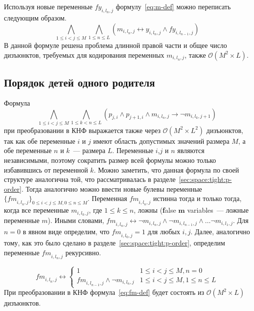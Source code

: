 Используя новые переменные $\mathit{fy}_{i,l_{n},j}$ формулу~\eqref{eq:m-def} можно переписать следующим образом.
%
\begin{equation}
\label{eq:m-def-tight}
  \bigwedge_{1 \leq i < j \leq M} \bigwedge_{1 \leq n \leq L} \left(m_{i,l_{n},j} \leftrightarrow y_{i,l_{n},j} \wedge \mathit{fy}_{i,l_{n - 1},j} \right)
\end{equation}
%
В данной формуле решена проблема длинной правой части и общее число дизъюнктов, требуемых для кодирования переменных $m_{i,l_{n},j}$, также $\mathcal{O}\left(M^{2} \times L\right)$. 


\subsection{Порядок детей одного родителя}
\label{sec:space:tight:m-order}

Формула $$\bigwedge_{1 \leq i < j \leq M} \bigwedge_{1 \leq k < n \leq L} \left(p_{j,i} \wedge p_{j + 1, i} \wedge m_{i,l_{n}, j} \rightarrow \neg m_{i, l_{k}, j + 1}\right)$$ при преобразовании в КНФ выражается также через $\mathcal{O}\left(M^{2} \times L^{2}\right)$ дизъюнктов, так как обе переменные $i$ и $j$ имеют область допустимых значений размера $M$, а обе переменные $n$ и $k$~{---} размера $L$.
Переменные $i$,$j$ и $n$ являются независимыми, поэтому сократить размер всей формулы можно только избавившись от переменной $k$.
Можно заметить, что данная формула по своей структуре аналогична той, что рассматривалась в разделе~\ref{sec:space:tight:p-order}.
Тогда аналогично можно ввести новые булевы переменные $\{\mathit{fm}_{i,l_{n},j}\}_{0 \leq i < j \leq M,0 \leq n \leq M}$.
Переменная $\mathit{fm}_{i,l_{n},j}$ истинна тогда и только тогда, когда все переменные $m_{i,l_{k},j}$, где $1 \leq k \leq n$, ложны (\textbf{f}alse $\boldsymbol{m}$ variables~{---} ложные переменные $m$).
Иными словами, $\mathit{fm}_{i,l_{n},j} \leftrightarrow \neg m_{i,l_{n},j} \wedge \neg m_{i, l_{n - 1}, j} \wedge \ldots \neg m_{i,l_{1},j}$. 
Для $n = 0$ в явном виде определим, что $\mathit{fm}_{i,l_{0},j} = 1$ для любых $i,j$.
Далее, аналогично тому, как это было сделано в разделе~\ref{sec:space:tight:p-order}, определим переменные $\mathit{fm}_{i,l_{n},j}$ рекурсивно.

\begin{equation}
\label{eq:fm-def}
  \mathit{fm}_{i,l_{n},j} \leftrightarrow 
    \begin{cases} 
      1                               & 1 \leq i < j \leq M, n = 0 \\
      \mathit{fm}_{i,l_{n - 1},j} \wedge \neg m_{i,l_{n},j}  & 1 \leq i < j \leq M, 1 \leq n \leq L
    \end{cases} 
\end{equation}
%
При преобразовании в КНФ формула~\eqref{eq:fm-def} будет состоять из $\mathcal{O}\left(M^{2} \times L\right)$ дизъюнктов.

